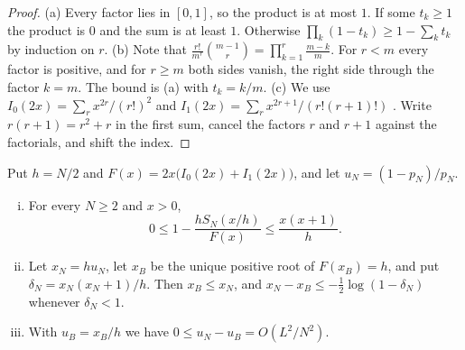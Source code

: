 \begin{proof}
(a) Every factor lies in $[0,1]$, so the product is at most $1$. If some $t_k\ge1$ the product is
$0$ and the sum is at least $1$. Otherwise $\prod_k(1-t_k)\ge1-\sum_kt_k$ by induction on $r$.
(b) Note that $\frac{r!}{m^r}\binom{m-1}{r}=\prod_{k=1}^r\frac{m-k}m$. For $r<m$ every factor is
positive, and for $r\ge m$ both sides vanish, the right side through the factor $k=m$. The bound is
(a) with $t_k=k/m$. (c) We use $I_0(2x)=\sum_rx^{2r}/(r!)^2$ and
$I_1(2x)=\sum_rx^{2r+1}/(r!(r+1)!)$ \cite[Eq.~10.25.2]{dlmf}. Write $r(r+1)=r^2+r$ in the first
sum, cancel the factors $r$ and $r+1$ against the factorials, and shift the index.
\end{proof}

\begin{theorem}\label{thm:bessel}
Put $h=N/2$ and $F(x)=2x\bigl(I_0(2x)+I_1(2x)\bigr)$, and let $u_N=(1-p_N)/p_N$.
\begin{enumerate}[(i)]
\item For every $N\ge2$ and $x>0$,
\begin{equation}\label{eq:uniformbessel}
0\le1-\frac{hS_N(x/h)}{F(x)}\le\frac{x(x+1)}h.
\end{equation}
\item Let $x_N=hu_N$, let $x_B$ be the unique positive root of $F(x_B)=h$, and put
$\delta_N=x_N(x_N+1)/h$. Then $x_B\le x_N$, and $x_N-x_B\le-\frac12\log(1-\delta_N)$ whenever
$\delta_N<1$.
\item With $u_B=x_B/h$ we have $0\le u_N-u_B=O(L^2/N^2)$.
\end{enumerate}
\end{theorem}

